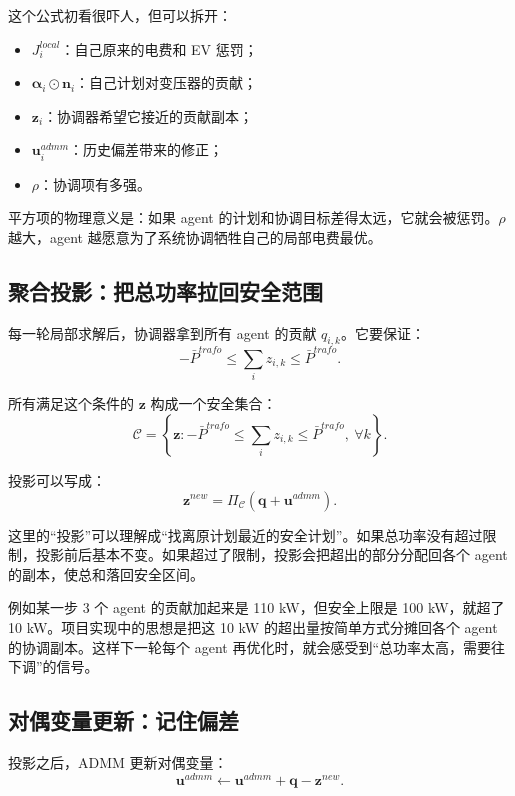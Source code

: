 \documentclass[UTF8,zihao=-4]{ctexart}
\begin{document}
这个公式初看很吓人，但可以拆开：
\begin{itemize}
  \item $J_i^{local}$：自己原来的电费和 EV 惩罚；
  \item $\bm{\alpha}_i\odot\bm{n}_i$：自己计划对变压器的贡献；
  \item $\bm{z}_i$：协调器希望它接近的贡献副本；
  \item $\bm{u}^{admm}_i$：历史偏差带来的修正；
  \item $\rho$：协调项有多强。
\end{itemize}

平方项的物理意义是：如果 agent 的计划和协调目标差得太远，它就会被惩罚。$\rho$ 越大，agent 越愿意为了系统协调牺牲自己的局部电费最优。

\subsection{聚合投影：把总功率拉回安全范围}

每一轮局部求解后，协调器拿到所有 agent 的贡献 $q_{i,k}$。它要保证：
\begin{equation}
-\bar P^{trafo}
\le
\sum_i z_{i,k}
\le
\bar P^{trafo}.
\end{equation}

所有满足这个条件的 $\bm{z}$ 构成一个安全集合：
\begin{equation}
\mathcal{C}
=
\left\{
\bm{z}:
-\bar P^{trafo}\le \sum_i z_{i,k}\le \bar P^{trafo},
\ \forall k
\right\}.
\end{equation}

投影可以写成：
\begin{equation}
\bm{z}^{new}
=
\Pi_{\mathcal{C}}(\bm{q}+\bm{u}^{admm}).
\end{equation}

这里的“投影”可以理解成“找离原计划最近的安全计划”。如果总功率没有超过限制，投影前后基本不变。如果超过了限制，投影会把超出的部分分配回各个 agent 的副本，使总和落回安全区间。

例如某一步 3 个 agent 的贡献加起来是 110 kW，但安全上限是 100 kW，就超了 10 kW。项目实现中的思想是把这 10 kW 的超出量按简单方式分摊回各个 agent 的协调副本。这样下一轮每个 agent 再优化时，就会感受到“总功率太高，需要往下调”的信号。

\subsection{对偶变量更新：记住偏差}

投影之后，ADMM 更新对偶变量：
\begin{equation}
\bm{u}^{admm}
\leftarrow
\bm{u}^{admm}
+
\bm{q}
-
\bm{z}^{new}.
\end{equation}
\end{document}
